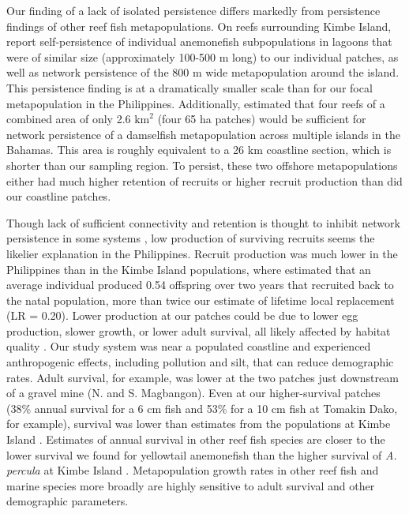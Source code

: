 \documentclass[12pt, oneside]{article}   	%
\begin{document}
Our finding of a lack of isolated persistence differs markedly from persistence findings of other reef fish metapopulations. On reefs surrounding Kimbe Island, \cite{salles_coral_2015} report self-persistence of individual anemonefish subpopulations in lagoons that were of similar size (approximately 100-500 m long) to our individual patches, as well as network persistence of the 800 m wide metapopulation around the island. This persistence finding is at a dramatically smaller scale than for our focal metapopulation in the Philippines. Additionally, \cite{johnson2018integrating} estimated that four reefs of a combined area of only 2.6 $\text{km}^2$ (four 65 ha patches) would be sufficient for network persistence of a damselfish metapopulation across multiple islands in the Bahamas. This area is roughly equivalent to a 26 km coastline section, which is shorter than our sampling region. To persist, these two offshore metapopulations either had much higher retention of recruits or higher recruit production than did our coastline patches. 

Though lack of sufficient connectivity and retention is thought to inhibit network persistence in some systems \citep[e.g., insufficient retention of offspring within reserves for eastern oysters (\textit{Crassostrea virginica}) in North Carolina;][]{puckett2016metapopulation}, low production of surviving recruits seems the likelier explanation in the Philippines. Recruit production was much lower in the Philippines than in the Kimbe Island populations, where \cite{salles2020strong} estimated that an average individual produced 0.54 offspring over two years that recruited back to the natal population, more than twice our estimate of lifetime local replacement (LR = 0.20). Lower production at our patches could be due to lower egg production, slower growth, or lower adult survival, all likely affected by habitat quality \citep[e.g.][]{salles2020strong, hayashi2019low}. Our study system was near a populated coastline and experienced anthropogenic effects, including pollution and silt, that can reduce demographic rates. Adult survival, for example, was lower at the two patches just downstream of a gravel mine (N. and S. Magbangon). Even at our higher-survival patches (38\% annual survival for a 6 cm fish and 53\% for a 10 cm fish at Tomakin Dako, for example), survival was lower than estimates from the populations at Kimbe Island \citep[85\% annual survival,][]{salles_coral_2015}. Estimates of annual survival in other reef fish species are closer to the lower survival we found for yellowtail anemonefish than the higher survival of \textit{A. percula} at Kimbe Island \citep[approximately 30\% annual survival for bluehead wrasse (\textit{Thalassoma bifasciatum}) and bicolour damselfish (\textit{Stegastes partitus}), respectively;][]{warner1988population, figueira2008small}. Metapopulation growth rates in other reef fish \citep[e.g.,][]{figueira2009connectivity} and marine species more broadly \citep{carson2011evaluating} are highly sensitive to adult survival and other demographic parameters.
\end{document}
